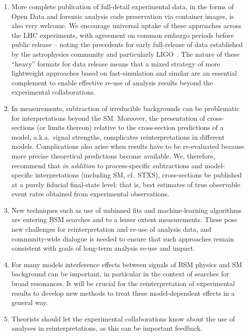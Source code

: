 \documentclass[a4paper,aps,prd,longbibliography,notitlepage,showpacs,amsmath,amssymb,superscriptaddress,nofootinbib,floatfix,11pt,preprintnumbers]{revtex4-1-mod}
\newcommand{\cf}{cf.\xspace}
\renewcommand{\emph}[1]{\textit{#1}}
\begin{document}
\begin{enumerate}
    \item More complete publication of full-detail experimental data, in the forms of Open Data and forensic analysis code preservation via container images, is also very welcome. We encourage universal uptake of these approaches across the LHC experiments, with agreement on common embargo periods before public release -- noting the precedents for early full-release of data established by the astrophysics community and particularly LIGO~\cite{Vallisneri:2014vxa}. The nature of these ``heavy'' formats for data release means that a mixed strategy of more lightweight approaches based on fast-simulation and similar are an essential complement to enable effective re-use of analysis results beyond the experimental collaborations.
    \item In measurements, subtraction of irreducible backgrounds can be problematic for interpretations beyond the SM.
    Moreover, the presentation of cross-sections (or limits thereon) \mbox{relative} to the cross-section predictions of a model, a.k.a.~signal strengths, complicates reinterpretations in different models. Complications also arise when results have to be re-evaluated because more precise theoretical predictions become available. We, therefore, recommend that \emph{in addition} to process-specific subtractions and model-specific interpretations (including SM, \cf~STXS), cross-sections be published at a purely fiducial final-state level: that is, best estimates of true observable event rates obtained from experimental observations. %
    \item New techniques such as use of unbinned fits and machine-learning algorithms are entering BSM searches and to a lesser extent measurements. These pose new challenges for reinterpretation and re-use of analysis data, and community-wide dialogue is needed to ensure that such approaches remain consistent with goals of long-term analysis re-use and impact.
    \item For many models interference effects between signals of BSM physics and SM background can be important, in particular in the context of searches for broad resonances. It will be crucial for the reinterpretation of experimental results to develop new methods to treat these model-dependent effects in a general way.
    \item Theorists should let the experimental collaborations know about the use of analyses in reinterpretations, as this can be important feedback.

\end{enumerate}
\end{document}

